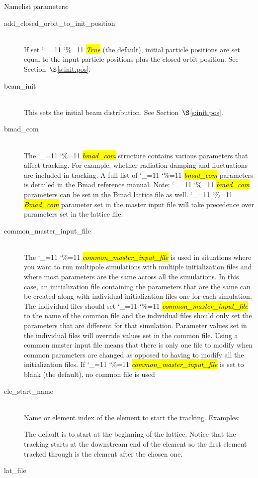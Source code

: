 \documentclass{hitec}
\newcommand\dottcmd[1]{\hl{\em#1}\endgroup}
\newcommand{\vn}{\begingroup\catcode`\_=11 \catcode`\%=11 \dottcmd}
\newcommand{\Newline}{\hfil \\}
\newcommand{\sref}[1]{$\S$\ref{#1}}
\begin{document}
{{{{{{Namelist parameters:
\begin{description}
\item[add_closed_orbit_to_init_position] \Newline
If set \vn{True} (the default), initial particle positions are set equal to the input particle positions
plus the closed orbit position. See Section~\sref{s:init.pos}.
%
\item[beam_init] \Newline
This sets the initial beam distribution. See Section~\sref{s:init.pos}.
%
\item[bmad_com] \Newline
The \vn{bmad_com} structure contains various parameters that affect tracking. For example, whether
radiation damping and fluctuations are included in tracking. A full list of \vn{bmad_com} parameters
is detailed in the Bmad reference manual. Note: \vn{bmad_com} parameters can be set in the Bmad
lattice file as well. \vn{Bmad_com} parameter set in the master input file will take precedence over
parameters set in the lattice file.
%
\item[common_master_input_file] \Newline
The \vn{common_master_input_file} is used in situations where you want to run multipole simulations
with multiple initialization files and where most parameters are the same across all the
simulations. In this case, an initialization file containing the parameters that are the same can be
created along with individual initialization files one for each simulation. The individual files
should set \vn{common_master_input_file} to the name of the common file and the individual files
should only set the parameters that are different for that simulation. Parameter values set in the
individual files will override values set in the common file. Using a common master input file means
that there is only one file to modify when common parameters are changed as opposed to having to
modify all the initialization files. If \vn{common_master_input_file} is set to blank (the default),
no common file is used
%
\item[ele_start_name] \Newline
Name or element index of the element to start the tracking. Examples:
The default is to start at the beginning of the lattice. Notice that the tracking starts at the
downstream end of the element so the first element tracked through is the element after the chosen
one.
%
\item[lat_file] \Newline

\end{description}}}}}}}
\end{document}
